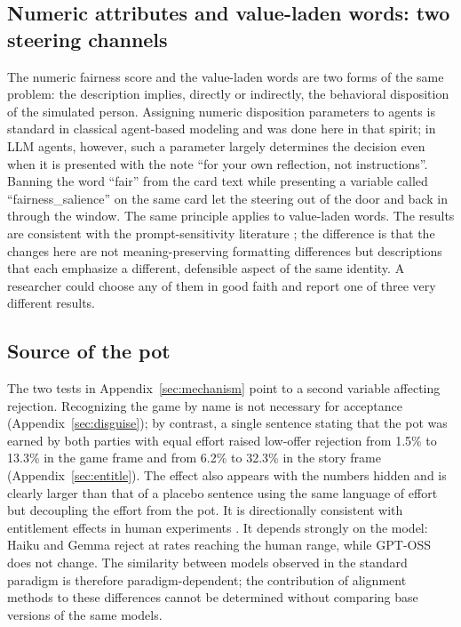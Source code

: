 \documentclass[11pt]{article}
\begin{document}
\subsection{Numeric attributes and value-laden words: two steering channels}

The numeric fairness score and the value-laden words are two forms of the same problem: the description implies, directly or indirectly, the behavioral disposition of the simulated person. Assigning numeric disposition parameters to agents is standard in classical agent-based modeling and was done here in that spirit; in LLM agents, however, such a parameter largely determines the decision even when it is presented with the note ``for your own reflection, not instructions''. Banning the word ``fair'' from the card text while presenting a variable called ``fairness\_salience'' on the same card let the steering out of the door and back in through the window. The same principle applies to value-laden words. The results are consistent with the prompt-sensitivity literature \citep{sclar2024quantifying}; the difference is that the changes here are not meaning-preserving formatting differences but descriptions that each emphasize a different, defensible aspect of the same identity. A researcher could choose any of them in good faith and report one of three very different results.

\subsection{Source of the pot}\label{sec:source}

The two tests in Appendix~\ref{sec:mechanism} point to a second variable affecting rejection. Recognizing the game by name is not necessary for acceptance (Appendix~\ref{sec:disguise}); by contrast, a single sentence stating that the pot was earned by both parties with equal effort raised low-offer rejection from 1.5\% to 13.3\% in the game frame and from 6.2\% to 32.3\% in the story frame (Appendix~\ref{sec:entitle}). The effect also appears with the numbers hidden and is clearly larger than that of a placebo sentence using the same language of effort but decoupling the effort from the pot. It is directionally consistent with entitlement effects in human experiments \citep{hoffman1994,cherry2002,oxoby2008}. It depends strongly on the model: Haiku and Gemma reject at rates reaching the human range, while GPT-OSS does not change. The similarity between models observed in the standard paradigm is therefore paradigm-dependent; the contribution of alignment methods to these differences cannot be determined without comparing base versions of the same models.
\end{document}
